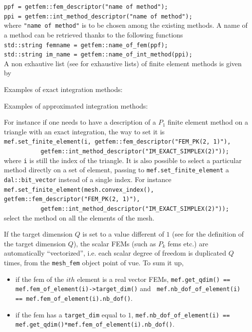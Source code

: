 \documentclass[11pt,a4paper]{article}
\begin{document}
{\tt ppf = getfem::fem\_descriptor("name of method"); \\
  ppi = getfem::int\_method\_descriptor("name of method");
}\\[0.5cm]
where {\tt "name of method"} is to be chosen among the existing methods.
A name of a method can be retrieved thanks to the following functions\\[0.5cm]
{\tt std::string femname = getfem::name\_of\_fem(ppf); \\
  std::string im\_name = getfem::name\_of\_int\_method(ppi);
}\\[0.5cm]
A non exhautive list (see \cite{FEMLIST} for exhaustive lists) of finite element methods is given by

Examples of exact integration methods:

Examples of approximated integration methods:


For instance if one needs to have a description of a $P_1$ finite element method on a triangle with an exact integration, the way to set it is\\[0.5cm]
{\tt mef.set\_finite\_element(i, getfem::fem\_descriptor("FEM\_PK(2, 1)"),\\$\mbox{}\ \ \ \ \ \ \ \ \ \ \ \ \ \ \ \ \ \ \ \ \ \ $  getfem::int\_method\_descriptor("IM\_EXACT\_SIMPLEX(2)")); }\\[0.5cm]
where {\tt i} is still the index of the triangle. It is also possible to select a particular method directly on a set of element, passing to {\tt mef.set\_finite\_element} a {\tt dal::bit\_vector} instead of a single index. For instance\\[0.5cm]
{\tt mef.set\_finite\_element(mesh.convex\_index(), getfem::fem\_descriptor("FEM\_PK(2, 1)"),\\$\mbox{}\ \ \ \ \ \ \ \ \ \ \ \ \ \ \ \ \ \ \ \ \ \ $ getfem::int\_method\_descriptor("IM\_EXACT\_SIMPLEX(2)")); }\\[0.5cm]
select the method on all the elements of the mesh.

If the target dimension $Q$ is set to a value different of $1$ (see
\cite{FEMLIST} for the definition of the target dimension $Q$), the
scalar FEMs (such as $P_k$ fems etc.) are automatically
``vectorized'', i.e. each scalar degree of freedom is duplicated $Q$
times, from the {\tt mesh\_fem} object point of vue. To sum it up,
\begin{itemize}
\item if the fem of the $ith$ element is a real vector FEMs, {\tt mef.get\_qdim() == mef.fem\_of\_element(i)->target\_dim()} and {\tt
    mef.nb\_dof\_of\_element(i) == mef.fem\_of\_element(i).nb\_dof()}.
\item if the fem has a {\tt target\_dim} equal to $1$, {\tt mef.nb\_dof\_of\_element(i) == mef.get\_qdim()*mef.fem\_of\_element(i).nb\_dof()}.
\end{itemize}
\end{document}
